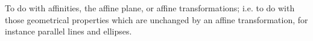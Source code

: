 To do with affinities, the affine plane, or affine transformations; i.e.
to do with those geometrical properties which are unchanged by an affine
transformation, for instance parallel lines and ellipses.